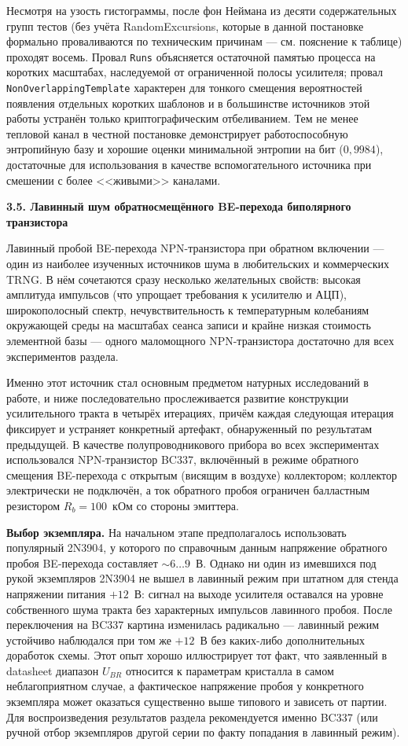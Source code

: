 Несмотря на узость гистограммы, после фон Неймана из десяти содержательных групп
тестов (без учёта RandomExcursions, которые в данной постановке формально проваливаются
по техническим причинам --- см. пояснение к таблице) проходят восемь. Провал
\texttt{Runs} объясняется остаточной памятью процесса на коротких масштабах,
наследуемой от ограниченной полосы усилителя; провал \texttt{NonOverlapping\-Template}
характерен для тонкого смещения вероятностей появления отдельных коротких шаблонов
и в большинстве источников этой работы устранён только криптографическим
отбеливанием. Тем не менее тепловой канал в честной постановке демонстрирует
работоспособную энтропийную базу и хорошие оценки минимальной энтропии на бит
($0{,}9984$), достаточные для использования в качестве вспомогательного источника
при смешении с более <<живыми>> каналами.

\textbf{3.5. Лавинный шум обратносмещённого BE-перехода биполярного транзистора}

Лавинный пробой BE-перехода NPN-транзистора при обратном включении --- один из
наиболее изученных источников шума в любительских и коммерческих TRNG. В нём сочетаются
сразу несколько желательных свойств: высокая амплитуда импульсов (что упрощает
требования к усилителю и АЦП), широкополосный спектр, нечувствительность к
температурным колебаниям окружающей среды на масштабах сеанса записи и крайне низкая
стоимость элементной базы --- одного маломощного NPN-транзистора достаточно для всех
экспериментов раздела.

Именно этот источник стал основным предметом натурных исследований в работе, и ниже
последовательно прослеживается развитие конструкции усилительного тракта в четырёх
итерациях, причём каждая следующая итерация фиксирует и устраняет конкретный
артефакт, обнаруженный по результатам предыдущей. В качестве полупроводникового
прибора во всех экспериментах использовался NPN-транзистор BC337, включённый в
режиме обратного смещения BE-перехода с открытым (висящим в воздухе) коллектором;
коллектор электрически не подключён, а ток обратного пробоя ограничен балластным
резистором $R_b=100$~кОм со стороны эмиттера.

\textbf{Выбор экземпляра.} На начальном этапе предполагалось использовать
популярный 2N3904, у которого по справочным данным напряжение обратного пробоя
BE-перехода составляет $\sim 6\ldots 9$~В. Однако ни один из имевшихся под рукой
экземпляров 2N3904 не вышел в лавинный режим при штатном для стенда напряжении
питания $+12$~В: сигнал на выходе усилителя оставался на уровне собственного шума
тракта без характерных импульсов лавинного пробоя. После переключения на BC337
картина изменилась радикально --- лавинный режим устойчиво наблюдался при том же
$+12$~В без каких-либо дополнительных доработок схемы. Этот опыт хорошо
иллюстрирует тот факт, что заявленный в datasheet диапазон $U_{BR}$ относится к
параметрам кристалла в самом неблагоприятном случае, а фактическое напряжение
пробоя у конкретного экземпляра может оказаться существенно выше типового и
зависеть от партии. Для воспроизведения результатов раздела рекомендуется
именно BC337 (или ручной отбор экземпляров другой серии по факту попадания в
лавинный режим).

